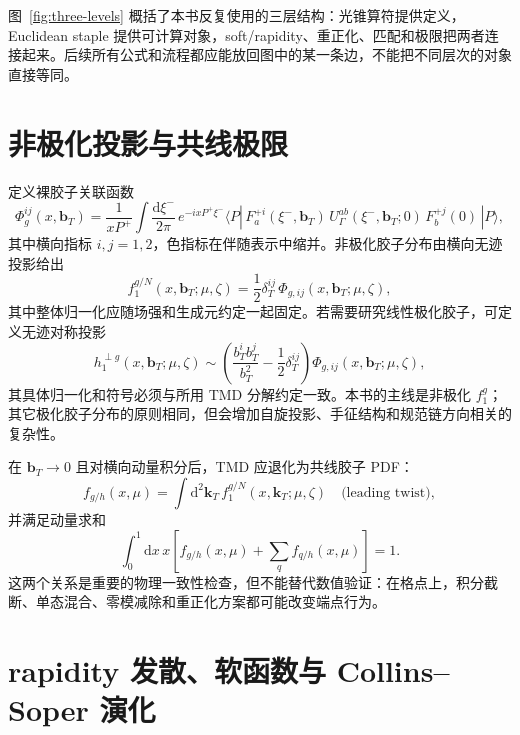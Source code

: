 \documentclass[UTF8,12pt,a4paper,twoside,openany]{ctexbook}
\newcommand{\dd}{\mathrm{d}}
\newcommand{\bT}{\boldsymbol b_T}
\newcommand{\kT}{\boldsymbol k_T}
\newcommand{\fone}{f_{1}^{g/N}}
\begin{document}
图~\ref{fig:three-levels} 概括了本书反复使用的三层结构：光锥算符提供定义，Euclidean staple 提供可计算对象，soft/rapidity、重正化、匹配和极限把两者连接起来。后续所有公式和流程都应能放回图中的某一条边，不能把不同层次的对象直接等同。

\section{非极化投影与共线极限}

定义裸胶子关联函数
\begin{equation}
  \Phi^{ij}_{g}(x,\bT)
  =\frac{1}{xP^+}\int\frac{\dd\xi^-}{2\pi}\,
  e^{-ixP^+\xi^-}
  \langle P|\,
  F^{+i}_a(\xi^-,\bT)\,
  U^{ab}_{\Gamma}(\xi^-,\bT;0)\,F^{+j}_b(0)\,|P\rangle ,
  \label{eq:gluoncorrelator}
\end{equation}
其中横向指标 \(i,j=1,2\)，色指标在伴随表示中缩并。非极化胶子分布由横向无迹投影给出
\begin{equation}
  \fone(x,\bT;\mu,\zeta)
  =\frac{1}{2}\delta^{ij}_{T}\,
  \Phi_{g,ij}(x,\bT;\mu,\zeta),
  \label{eq:f1projection}
\end{equation}
其中整体归一化应随场强和生成元约定一起固定。若需要研究线性极化胶子，可定义无迹对称投影
\begin{equation}
  h_{1}^{\perp g}(x,\bT;\mu,\zeta)
  \sim
  \left(\frac{b_T^ib_T^j}{b_T^2}-\frac{1}{2}\delta_T^{ij}\right)
  \Phi_{g,ij}(x,\bT;\mu,\zeta),
  \label{eq:h1perpprojection}
\end{equation}
其具体归一化和符号必须与所用 TMD 分解约定一致。本书的主线是非极化 \(f_1^g\)；其它极化胶子分布的原则相同，但会增加自旋投影、手征结构和规范链方向相关的复杂性\cite{Meissner2007}。

在 \(\bT\to0\) 且对横向动量积分后，TMD 应退化为共线胶子 PDF：
\begin{equation}
  f_{g/h}(x,\mu)
  =\int\dd^2\kT\,\fone(x,\kT;\mu,\zeta)
  \quad\text{(leading twist)},
  \label{eq:collinearlimit}
\end{equation}
并满足动量求和
\begin{equation}
  \int_0^1\dd x\,x\left[f_{g/h}(x,\mu)+\sum_q f_{q/h}(x,\mu)\right]=1 .
  \label{eq:momentumsum}
\end{equation}
这两个关系是重要的物理一致性检查，但不能替代数值验证：在格点上，积分截断、单态混合、零模减除和重正化方案都可能改变端点行为。

\section{rapidity 发散、软函数与 Collins--Soper 演化}
\end{document}
